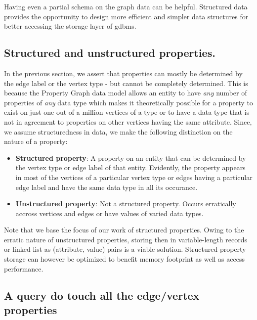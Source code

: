 Having even a partial schema on the graph data can be helpful. Structured data provides the opportunity to design more efficient and simpler data structures for better accessing the storage layer of \gls{gdbms}.

\subsection{Structured and unstructured properties.}

In the previous section, we assert that properties can mostly be determined by the edge label or the vertex type - but cannot be completely determined. This is because the Property Graph data model allows an entity to have \emph{any} number of properties of \emph{any} data type which makes it theoretically possible for a property to exist on just one out of a million vertices of a type or to have a data type that is not in agreement to properties on other vertices having the same attribute. Since, we assume structuredness in data, we make the following distinction on the nature of a property:

\begin{itemize}
	
	\item \textbf{Structured property}: A property on an entity that can be determined by the vertex type or edge label of that entity. Evidently, the property appears in most of the vertices of a particular vertex type or edges having a particular edge label and have the same data type in all its occurance.
	
	\item \textbf{Unstructured property}: Not a structured property. Occurs erratically accross vertices and edges or have values of varied data types.

\end{itemize}

Note that we base the focus of our work of structured properties. Owing to the erratic nature of unstructured properties, storing then in variable-length records or linked-list as (attribute, value) pairs is a viable solution. Structured property storage can however be optimized to benefit memory footprint as well as access performance.

\subsection{A query do touch all the edge/vertex properties}


